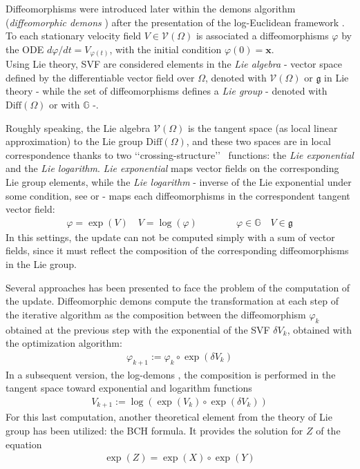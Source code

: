 Diffeomorphisms were introduced later within the demons algorithm (\emph{diffeomorphic demons} \cite{vercauteren2006robust}) after the presentation of the log-Euclidean framework \cite{Arsigny:MRM:06}. 
To each stationary velocity field $V \in \mathcal{V}(\Omega)$ is associated a diffeomorphisms $\varphi$ by the ODE $d\varphi /dt = V_{\varphi(t)} $, with the initial condition $\varphi(0) = \mathbf{x}$.\\
Using Lie theory, SVF are considered elements in the \emph{Lie algebra} - vector space defined by the differentiable vector field over $\Omega$, denoted with $\mathcal{V}(\Omega)$ or $\mathfrak{g}$ in Lie theory - while the set of diffeomorphisms defines a \emph{Lie group} - denoted with $\text{Diff}(\Omega)$ or with $\mathbb{G}$ -.

Roughly speaking, the Lie algebra $\mathcal{V}(\Omega)$ is the tangent space (as local linear approximation) to the Lie group $\text{Diff}(\Omega)$, and these two spaces are in local correspondence thanks to two \lq\lq crossing-structure\rq\rq~ functions: the \emph{Lie exponential} and the \emph{Lie logarithm}. \emph{Lie exponential} maps vector fields on the corresponding Lie group elements, while the \emph{Lie logarithm} - inverse of the Lie exponential under some condition, see \cite{do1976differential} or \cite{lee2012introduction} - maps each diffeomorphisms in the correspondent tangent vector field:
\begin{align*}
\varphi = \exp(V)  
\quad
V = \log(\varphi ) 
\qquad \qquad
\varphi  \in \mathbb{G}
\quad
V \in \mathfrak{g}
\end{align*}
In this settings, the update can not be computed simply with a sum of vector fields, since it must reflect the composition of the corresponding diffeomorphisms in the Lie group.

Several approaches has been presented to face the problem of the computation of the update. Diffeomorphic demons compute the transformation at each step of the iterative algorithm as the composition between the diffeomorphism $\varphi_{k}$ obtained at the previous step with the exponential of the SVF $\delta V_{k}$, obtained with the optimization algorithm:
\begin{align*}
\varphi_{k + 1} := \varphi_{k}  \circ \exp(\delta V_{k})
\end{align*}
In a subsequent version, the log-demons \cite{vercauteren08}, the composition is performed in the tangent space toward exponential and logarithm functions
\begin{align}\label{eq:bch_problem}
V_{k + 1} := \log( \exp(V_{k})  \circ \exp(\delta V_{k}))
\end{align}
For this last computation, another theoretical element from the theory of Lie group has been utilized: the BCH formula. It provides the solution for $Z$ of the equation 
\begin{align*}
 \exp(Z) = \exp(X)\circ\exp(Y)
\end{align*}


